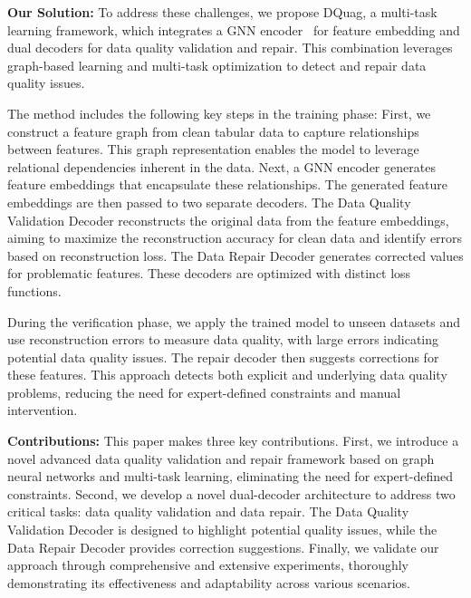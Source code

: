 \noindent \textbf{Our Solution:} To address these challenges, we propose DQuag, a multi-task learning framework, which integrates a GNN encoder~\cite{li2024graph} for feature embedding and dual decoders for data quality validation and repair. 
This combination leverages graph-based learning and multi-task optimization to detect and repair data quality issues.

The method includes the following key steps in the training phase: 
First, we construct a feature graph from clean tabular data to capture relationships between features. 
This graph representation enables the model to leverage relational dependencies inherent in the data. 
Next, a GNN encoder generates feature embeddings that encapsulate these relationships. 
The generated feature embeddings are then passed to two separate decoders. 
The Data Quality Validation Decoder reconstructs the original data from the feature embeddings, aiming to maximize the reconstruction accuracy for clean data and identify errors based on reconstruction loss. 
The Data Repair Decoder generates corrected values for problematic features. 
These decoders are optimized with distinct loss functions.

During the verification phase, we apply the trained model to unseen
datasets and use reconstruction errors to measure data quality, with
large errors indicating potential data quality issues. 
The repair decoder then suggests corrections for these features.
This approach detects both explicit and underlying data quality problems, reducing the need for expert-defined constraints and manual intervention. 

\noindent\textbf{Contributions:}  
This paper makes three key contributions. 
First, we introduce a novel advanced data quality validation and repair framework based on graph neural networks and multi-task learning, eliminating the need for expert-defined constraints. 
Second, we develop a novel dual-decoder architecture to address two critical tasks: data quality validation and data repair. 
The Data Quality Validation Decoder is designed to highlight potential quality issues, while the Data Repair Decoder provides correction suggestions.
Finally, we validate our approach through comprehensive and extensive experiments, thoroughly demonstrating its effectiveness and adaptability across various scenarios.





